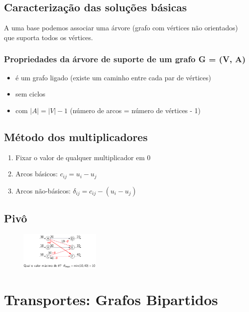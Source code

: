 \documentclass[10pt, a4paper]{article}
\begin{document}
\begin{multicols}{2}
\subsection{Caracterização das soluções básicas}

A uma base podemos associar uma árvore (grafo com vértices não orientados) que suporta todos os vértices.

\subsubsection{Propriedades da árvore de suporte de um grafo G = (V, A)}

\begin{itemize}
    \item é um grafo ligado (existe um caminho entre cada par de vértices)
    \item sem ciclos
    \item com \(|A| = |V| - 1\) (número de arcos = número de vértices - 1)
\end{itemize}

\subsection{Método dos multiplicadores}

\begin{enumerate}
    \item Fixar o valor de qualquer multiplicador em 0
    \item Arcos básicos: \(c_{ij} = u_i - u_j\)
    \item Arcos não-básicos: $\delta_{ij} = c_{ij} - (u_i - u_j)$
\end{enumerate}

\subsection{Pivô}

\begin{figure}[H]
    \centering
    \includegraphics[width=0.35\textwidth]{pivo_intr.png}
\end{figure}



\section{Transportes: Grafos Bipartidos}


\end{multicols}
\end{document}
